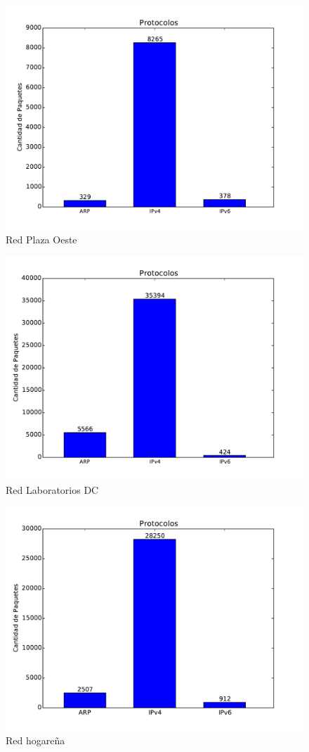 \begin{figure}[H]
\begin{center}
\includegraphics[width=0.8\columnwidth]{graficos/plaza_s1.pdf}
\caption{Red Plaza Oeste}
\end{center}
\end{figure}

\begin{figure}[H]
\begin{center}
\includegraphics[width=0.8\columnwidth]{graficos/dc_s1.pdf}
\caption{Red Laboratorios DC}
\end{center}
\end{figure}

\begin{figure}[H]
\begin{center}
\includegraphics[width=0.8\columnwidth]{graficos/hogar_s1.pdf}
\caption{Red hogareña}
\end{center}
\end{figure}

